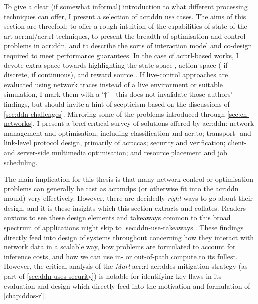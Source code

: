To give a clear (if somewhat informal) introduction to what different processing techniques can offer, I present a selection of \gls{acr:ddn} use cases.
The aims of this section are threefold: to offer a rough intuition of the capabilities of state-of-the-art \gls{acr:ml}/\gls{acr:rl} techniques, to present the breadth of optimisation and control problems in \gls{acr:ddn}, and to describe the sorts of interaction model and co-design required to meet performance guarantees.
In the case of \gls{acr:rl}-based works, I devote extra space towards highlighting the state space \prllitstate{}, action space (\rllitact{} if discrete, \rllitactreal{} if continuous), and reward source \prllitreward.
If live-control approaches are evaluated using network traces instead of a live environment or suitable simulation, I mark them with a `$\dagger$'---this does not invalidate those authors' findings, but should invite a hint of scepticism based on the discussions of \cref{sec:ddn-challenges}.
Mirroring some of the problems introduced through \cref{sec:ch-networks}, I present a brief critical survey of solutions offered by \gls{acr:ddn}: network management and optimisation, including classification and \gls{acr:to}; transport- and link-level protocol design, primarily of \glspl{acr:cca}; security and verification; client- and server-side multimedia optimisation; and resource placement and job scheduling.

The main implication for this thesis is that many network control or optimisation problems can generally be cast as \glspl{acr:mdp} (or otherwise fit into the \gls{acr:ddn} mould) very effectively.
However, there are decidedly \emph{right} ways to go about their design, and it is these insights which this section extracts and collates.
Readers anxious to see these design elements and takeaways common to this broad spectrum of applications might skip to \cref{sec:ddn-use-takeaways}.
These findings directly feed into design of systems throughout  concerning how they interact with network data in a scalable way, how problems are formulated to account for inference costs, and how we can use in- or out-of-path compute to its fullest.
However, the critical analysis of the \emph{Marl} \gls{acr:rl} \gls{acr:ddos} mitigation strategy (as part of \cref{sec:ddn-uses-security}) is notable for identifying key flaws in its evaluation and design which directly feed into the motivation and formulation of \cref{chap:ddos-rl}.
%
%
%
%
%
%

